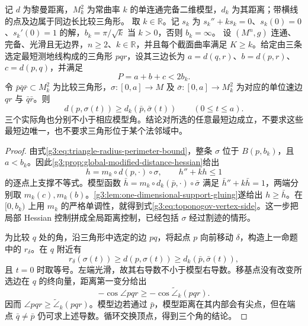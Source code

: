 \begin{theorem}\label{g3:thm:toponogov-triangle}
	记 \(d\) 为黎曼距离，\(M_k^2\) 为常曲率 \(k\) 的单连通完备二维模型，\(d_k\) 为其距离；带横线的点及边属于同边长比较三角形。
	取 \(k\in\mathbb R\)。记 \(s_k\) 为 \(s_k''+ks_k=0\)、\(s_k(0)=0\)、\(s_k'(0)=1\) 的解，\(b_k=\pi/\sqrt k\) 当 \(k>0\)，否则 \(b_k=\infty\)。
 设 \((M^n,g)\) 连通、完备、光滑且无边界，\(n\ge2\)、\(k\in\mathbb R\)，并且每个截面曲率满足 \(K\ge k\)。给定由三条选定最短测地线构成的三角形 \(pqr\)，设其三边长为 \(a=d(q,r)\)、\(b=d(p,r)\)、\(c=d(p,q)\)，并满足
 \[
 P=a+b+c<2b_k.
 \]
 令 \(\bar p\bar q\bar r\subset M_k^2\) 为比较三角形，\(\sigma:[0,a]\to M\) 及 \(\bar\sigma:[0,a]\to M_k^2\) 为对应的单位速边 \(qr\) 与 \(\bar q\bar r\)。则
 \begin{equation}\label{g3:eq:toponogov-vertex-side}
 d(p,\sigma(t))\ge d_k(\bar p,\bar\sigma(t))\qquad(0\le t\le a).
 \end{equation}
 三个实际角也分别不小于相应模型角。结论对所选的任意最短边成立，不要求这些最短边唯一，也不要求三角形位于某个法邻域中。
\end{theorem}
\begin{proof}
 由式\eqref{g3:eq:triangle-radius-perimeter-bound}，整条 \(\sigma\) 位于 \(B(p,b_k)\)，且 \(a<b_k\)。因此\cref{g3:prop:global-modified-distance-hessian}给出
 \[
 h=m_k\circ d(p,\cdot)\circ\sigma,
 \qquad h''+kh\le1
 \]
 的逐点上支撑不等式。模型函数 \(\bar h=m_k\circ d_k(\bar p,\cdot)\circ\bar\sigma\) 满足 \(\bar h''+k\bar h=1\)，两端分别取 \(m_k(c),m_k(b)\)。\cref{g3:lem:one-dimensional-support-gluing}遂给出 \(h\ge\bar h\)。在 \([0,b_k)\) 上用 \(m_k\) 的严格单调性，就得到式\eqref{g3:eq:toponogov-vertex-side}。这一步把局部 Hessian 控制拼成全局距离控制，已经包括 \(\sigma\) 经过割迹的情形。

 为比较 \(q\) 处的角，沿三角形中选定的边 \(pq\)，将起点 \(p\) 向前移动 \(\delta\)，构造上一命题中的 \(r_\delta\)。在 \(q\) 附近有
 \[
 r_\delta(\sigma(t))\ge d(p,\sigma(t))
 \ge d_k(\bar p,\bar\sigma(t)),
 \]
 且 \(t=0\) 时取等号。左端光滑，故其右导数不小于模型右导数。移基点没有改变所选边在 \(q\) 的终向量，距离第一变分给出
 \[
 -\cos\angle pqr\ge-\cos\widetilde\angle_k(pqr).
 \]
 因而 \(\angle pqr\ge\widetilde\angle_k(pqr)\)。模型边若通过 \(\bar p\)，模型距离在其内部会有尖点，但在端点 \(\bar q\ne\bar p\) 仍可求上述导数。循环交换顶点，得到三个角的结论。
\end{proof}

